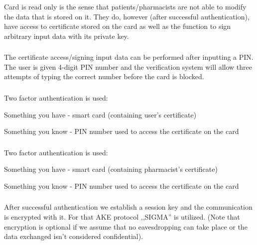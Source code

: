 \subsubsection{}

Card is read only is the sense that patients/pharmacists are not able to modify the data that is stored on it. They do, however (after successful authentication), have access to certificate stored on the card as well as the function to sign arbitrary input data with its private key.

\subsubsection{}

The certificate access/signing input data can be performed after inputting a PIN. The user is given 4-digit PIN number and the verification system will allow three attempts of typing the correct number before the card is blocked.

\subsubsection{}

Two factor authentication is used:
\begin{packed_enum}
 \item Something you have - smart card (containing user's certificate)
 \item Something you know - PIN number used to access the certificate on the card
\end{packed_enum}

\subsubsection{}

Two factor authentication is used:
\begin{packed_enum}
 \item Something you have - smart card (containing pharmacist's certificate)
 \item Something you know - PIN number used to access the certificate on the card
\end{packed_enum}

\subsubsection{}
After successful authentication we establish a session key and the communication is encrypted with it. For that AKE protocol ,,SIGMA'' is utilized. (Note that encryption is optional if we assume that no eavesdropping can take place or the data exchanged isn't considered confidential).


